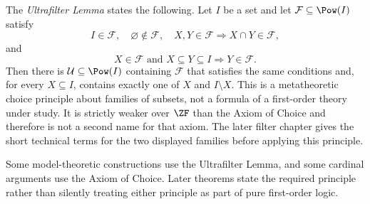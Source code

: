 \begin{definition}
\label{def:ultrafilter-lemma}
The \emph{Ultrafilter Lemma} states the following.  Let \(I\) be a set and let
\(\mathcal F\subseteq\Pow(I)\) satisfy
\[
 I\in\mathcal F,\quad\varnothing\notin\mathcal F,\quad
 X,Y\in\mathcal F\Rightarrow X\cap Y\in\mathcal F,
\]
and
\[
 X\in\mathcal F\text{ and }X\subseteq Y\subseteq I
 \Rightarrow Y\in\mathcal F.
\]
Then there is \(\mathcal U\subseteq\Pow(I)\) containing \(\mathcal F\) that
satisfies the same conditions and, for every \(X\subseteq I\), contains
exactly one of \(X\) and \(I\setminus X\).  This is a metatheoretic choice
principle about families of subsets, not a formula of a first-order theory
under study.  It is strictly weaker over \(\ZF\) than the Axiom of Choice and
therefore is not a second name for that axiom.  The later filter chapter gives
the short technical terms for the two displayed families before applying this
principle.
\end{definition}

Some model-theoretic constructions use the Ultrafilter Lemma, and some cardinal
arguments use the Axiom of Choice.  Later theorems state the required principle
rather than silently treating either principle as part of pure first-order
logic.

